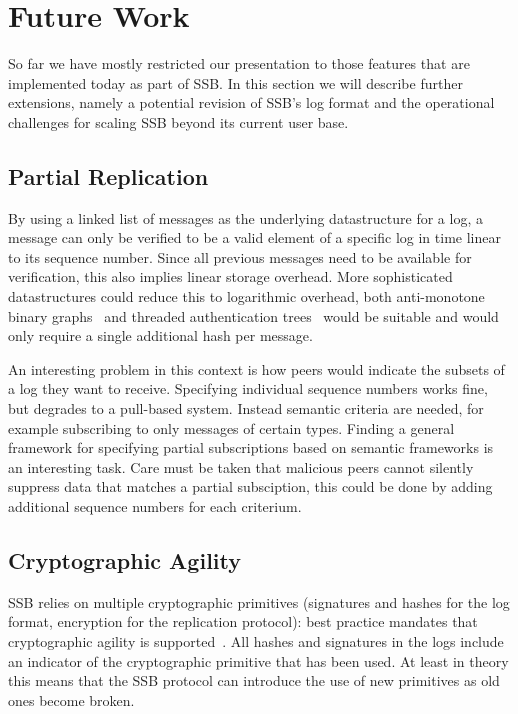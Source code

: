 \documentclass[9pt,sigconf]{acmart}
\begin{document}

\section{Future Work}
\label{sec:wip}

So far we have mostly restricted our presentation to those features
that are implemented today as part of SSB. In this section we will
describe further extensions, namely a potential revision of SSB's log
format and the operational challenges for scaling SSB beyond its
current user base.

\subsection{Partial Replication}

By using a linked list of messages as the underlying datastructure for
a log, a message can only be verified to be a valid element of a
specific log in time linear to its sequence number. Since all previous
messages need to be available for verification, this also implies
linear storage overhead. More sophisticated datastructures could
reduce this to logarithmic overhead, both anti-monotone binary
graphs~\cite{buldas1998new} and threaded authentication
trees~\cite{buldas2000optimally} would be suitable and would only
require a single additional hash per message.

An interesting problem in this context is how peers would indicate the subsets of a log they want to receive. Specifying individual sequence numbers works fine, but degrades to a pull-based system. Instead semantic criteria are needed, for example subscribing to only messages of certain types. Finding a general framework for specifying partial subscriptions based on semantic frameworks is an interesting task. Care must be taken that malicious peers cannot silently suppress data that matches a partial subsciption, this could be done by adding additional sequence numbers for each criterium.

\subsection{Cryptographic Agility}

SSB relies on multiple cryptographic primitives (signatures and hashes
for the log format, encryption for the replication protocol): best
practice mandates that cryptographic agility is
supported~\cite{nelson2011crypto}. All hashes and signatures in the
logs include an indicator of the cryptographic primitive that has been
used. At least in theory this means that the SSB protocol can
introduce the use of new primitives as old ones become broken.
\end{document}
